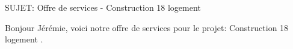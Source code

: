 SUJET: Offre de services - Construction 18 logement \par Bonjour Jérémie, voici notre offre de services pour le projet: Construction 18 logement .

